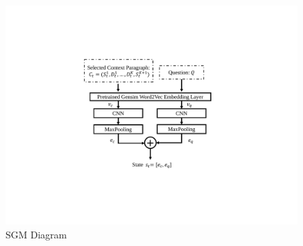 \begin{figure}\centering
\begin{minipage}{.45\textwidth}
 \includegraphics[width=0.9\linewidth]{fig/fig1_2.pdf}
 \caption{SGM Diagram}
 \label{fig:sgmDiagram}
\end{minipage}
\vspace{-2ex}
\end{figure}